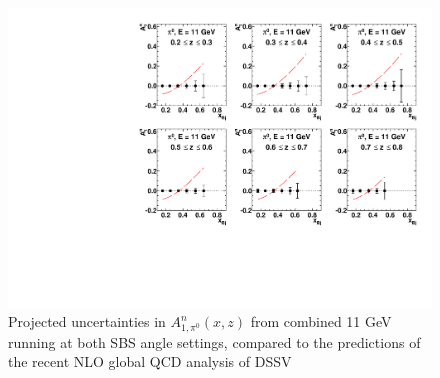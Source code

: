 \begin{figure}[h]
  \begin{center}
    \includegraphics[width=.75\textwidth]{figures/A1n_vs_x_E11_pi0.pdf}
  \end{center}
  \caption{\label{A1n_pi0_11gev} Projected uncertainties in $A_{1,\pi^0}^{n}(x,z)$ from combined 11 GeV running at both SBS angle settings, compared to the predictions of the recent NLO global QCD analysis of DSSV~\cite{DSSVplus}}
\end{figure}

